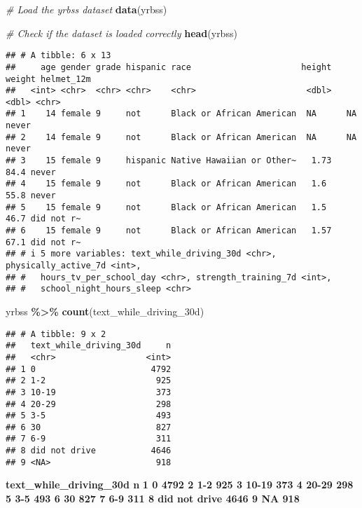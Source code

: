\documentclass[
]{article}
\newenvironment{Shaded}{\begin{snugshade}}{\end{snugshade}}
\newcommand{\CommentTok}[1]{\textcolor[rgb]{0.56,0.35,0.01}{\textit{#1}}}
\newcommand{\FunctionTok}[1]{\textcolor[rgb]{0.13,0.29,0.53}{\textbf{#1}}}
\newcommand{\NormalTok}[1]{#1}
\newcommand{\SpecialCharTok}[1]{\textcolor[rgb]{0.81,0.36,0.00}{\textbf{#1}}}
\begin{document}
\begin{Shaded}
\begin{Highlighting}[]
\CommentTok{\# Load the yrbss dataset}
\FunctionTok{data}\NormalTok{(yrbss)}

\CommentTok{\# Check if the dataset is loaded correctly}
\FunctionTok{head}\NormalTok{(yrbss)}
\end{Highlighting}
\end{Shaded}

\begin{verbatim}
## # A tibble: 6 x 13
##     age gender grade hispanic race                      height weight helmet_12m
##   <int> <chr>  <chr> <chr>    <chr>                      <dbl>  <dbl> <chr>     
## 1    14 female 9     not      Black or African American  NA      NA   never     
## 2    14 female 9     not      Black or African American  NA      NA   never     
## 3    15 female 9     hispanic Native Hawaiian or Other~   1.73   84.4 never     
## 4    15 female 9     not      Black or African American   1.6    55.8 never     
## 5    15 female 9     not      Black or African American   1.5    46.7 did not r~
## 6    15 female 9     not      Black or African American   1.57   67.1 did not r~
## # i 5 more variables: text_while_driving_30d <chr>, physically_active_7d <int>,
## #   hours_tv_per_school_day <chr>, strength_training_7d <int>,
## #   school_night_hours_sleep <chr>
\end{verbatim}

\begin{Shaded}
\begin{Highlighting}[]
\NormalTok{yrbss }\SpecialCharTok{\%\textgreater{}\%}
  \FunctionTok{count}\NormalTok{(text\_while\_driving\_30d)}
\end{Highlighting}
\end{Shaded}

\begin{verbatim}
## # A tibble: 9 x 2
##   text_while_driving_30d     n
##   <chr>                  <int>
## 1 0                       4792
## 2 1-2                      925
## 3 10-19                    373
## 4 20-29                    298
## 5 3-5                      493
## 6 30                       827
## 7 6-9                      311
## 8 did not drive           4646
## 9 <NA>                     918
\end{verbatim}

\textbf{text\_while\_driving\_30d n} \textbf{1 0 4792 2 1-2 925 3 10-19
373 4 20-29 298 5 3-5 493 6 30 827 7 6-9 311 8 did not drive 4646 9 NA
918}
\end{document}
